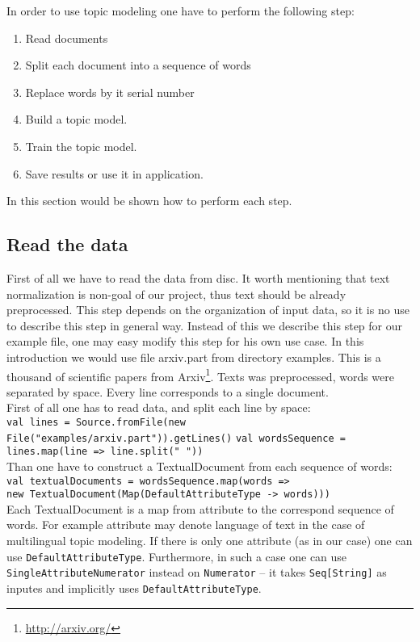 In order to use topic modeling one have to perform the following step:
\begin{enumerate}
    \item Read documents
    \item Split each document into a sequence of words
    \item Replace words by it serial number
    \item Build a topic model.
    \item Train the topic model.
    \item Save results or use it in application. 
\end{enumerate}

In this section would be shown how to perform each step. 
\subsection{Read the data}
    First of all we have to read the data from disc. It worth mentioning that text normalization is non\--goal of our project, thus text should be already preprocessed. 
    This step depends on the organization of input data, so it is
    no use to describe this step in general way. Instead of this we describe this step for our example file, one may easy modify this step for his own use case. %
    In this introduction we would use file arxiv.part from directory examples. This is a thousand of scientific  papers 
    from Arxiv\footnote{\url{http://arxiv.org/}}. Texts was preprocessed, words were separated by space. Every line corresponds
    to a single document.\\
    First of all one has to read data, and split each line by space:\\
    \texttt{val lines = Source.fromFile(new File("examples/arxiv.part")).getLines()}
    \texttt{val wordsSequence = lines.map(line => line.split(" "))}\\
    Than one have to construct a TextualDocument from each sequence of words:\\
    \texttt{val textualDocuments = wordsSequence.map(words => \\  new TextualDocument(Map(DefaultAttributeType -> words)))}\\
    Each TextualDocument is a map from attribute to the correspond sequence of words. For example attribute may denote language of
    text in the case of multilingual topic modeling. 
    If there is only one attribute (as in our case) one can use \texttt{DefaultAttributeType}.  Furthermore, in such a case one can use \texttt{SingleAttributeNumerator} instead on \texttt{Numerator} -- it takes \texttt{Seq[String]} as inputes and implicitly uses \texttt{DefaultAttributeType}.
